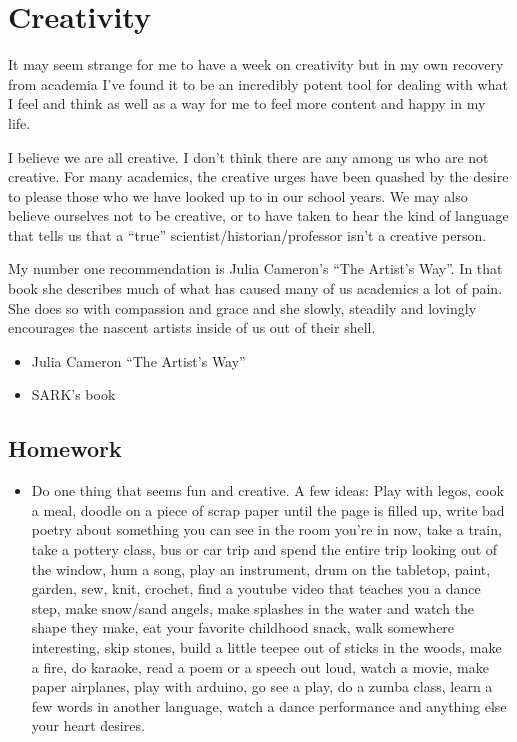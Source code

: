 \documentclass[]{book}
\providecommand{\tightlist}{%
  \setlength{\itemsep}{0pt}\setlength{\parskip}{0pt}}
\begin{document}
\chapter{Creativity}\label{creativity}

It may seem strange for me to have a week on creativity but in my own
recovery from academia I've found it to be an incredibly potent tool for
dealing with what I feel and think as well as a way for me to feel more
content and happy in my life.

I believe we are all creative. I don't think there are any among us who
are not creative. For many academics, the creative urges have been
quashed by the desire to please those who we have looked up to in our
school years. We may also believe ourselves not to be creative, or to
have taken to hear the kind of language that tells us that a ``true''
scientist/historian/professor isn't a creative person.

My number one recommendation is Julia Cameron's ``The Artist's Way''. In
that book she describes much of what has caused many of us academics a
lot of pain. She does so with compassion and grace and she slowly,
steadily and lovingly encourages the nascent artists inside of us out of
their shell.

\begin{itemize}
\tightlist
\item
  Julia Cameron ``The Artist's Way''
\item
  SARK's book
\end{itemize}

\section{Homework}\label{homework-3}

\begin{itemize}
\tightlist
\item
  Do one thing that seems fun and creative. A few ideas: Play with
  legos, cook a meal, doodle on a piece of scrap paper until the page is
  filled up, write bad poetry about something you can see in the room
  you're in now, take a train, take a pottery class, bus or car trip and
  spend the entire trip looking out of the window, hum a song, play an
  instrument, drum on the tabletop, paint, garden, sew, knit, crochet,
  find a youtube video that teaches you a dance step, make snow/sand
  angels, make splashes in the water and watch the shape they make, eat
  your favorite childhood snack, walk somewhere interesting, skip
  stones, build a little teepee out of sticks in the woods, make a fire,
  do karaoke, read a poem or a speech out loud, watch a movie, make
  paper airplanes, play with arduino, go see a play, do a zumba class,
  learn a few words in another language, watch a dance performance and
  anything else your heart desires.
\end{itemize}
\end{document}
